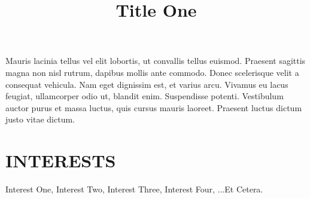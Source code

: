 \documentclass[mm]{simple_style}
\begin{document}
\begin{resume}
\title{\textbf{Title One}}
\begin{position}
Mauris lacinia tellus vel elit lobortis, ut convallis tellus euismod. Praesent 
sagittis magna non nisl rutrum, dapibus mollis ante commodo. Donec scelerisque 
velit a consequat vehicula. Nam eget dignissim est, et varius arcu. Vivamus eu 
lacus feugiat, ullamcorper odio ut, blandit enim. Suspendisse potenti. 
Vestibulum auctor purus et massa luctus, quis cursus mauris laoreet. Praesent 
luctus dictum justo vitae dictum.
\end{position}
\newline
\sectionline
\section{INTERESTS}
Interest One, Interest Two, Interest Three, Interest Four, ...Et Cetera.
\end{resume}
\end{document}
